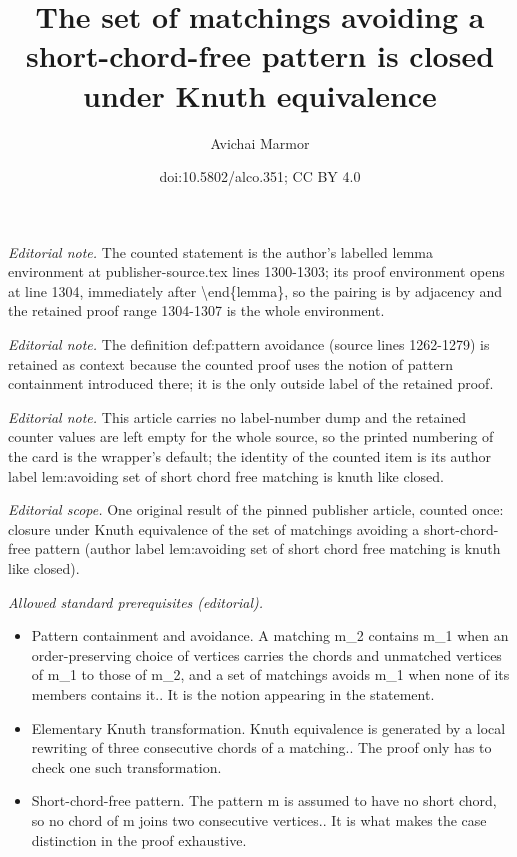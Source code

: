 \documentclass[11pt]{article}
\title{The set of matchings avoiding a short-chord-free pattern is closed under Knuth equivalence}
\author{Avichai Marmor}
\date{doi:10.5802/alco.351; CC BY 4.0}
\theoremstyle{definition}
\numberwithin{equation}{section}
\begin{document}
\maketitle
\noindent\textit{Editorial note.} The counted statement is the author's labelled lemma environment at publisher-source.tex lines 1300-1303; its proof environment opens at line 1304, immediately after \textbackslash{}end\{lemma\}, so the pairing is by adjacency and the retained proof range 1304-1307 is the whole environment.\par\medskip
\noindent\textit{Editorial note.} The definition def:pattern avoidance (source lines 1262-1279) is retained as context because the counted proof uses the notion of pattern containment introduced there; it is the only outside label of the retained proof.\par\medskip
\noindent\textit{Editorial note.} This article carries no label-number dump and the retained counter values are left empty for the whole source, so the printed numbering of the card is the wrapper's default; the identity of the counted item is its author label lem:avoiding set of short chord free matching is knuth like closed.\par\medskip
\noindent\textit{Editorial scope.} One original result of the pinned publisher article, counted once: closure under Knuth equivalence of the set of matchings avoiding a short-chord-free pattern (author label lem:avoiding set of short chord free matching is knuth like closed).\par\medskip
\noindent\textit{Allowed standard prerequisites (editorial).}\begin{itemize}
\item Pattern containment and avoidance. A matching m\_2 contains m\_1 when an order-preserving choice of vertices carries the chords and unmatched vertices of m\_1 to those of m\_2, and a set of matchings avoids m\_1 when none of its members contains it.. It is the notion appearing in the statement.
\item Elementary Knuth transformation. Knuth equivalence is generated by a local rewriting of three consecutive chords of a matching.. The proof only has to check one such transformation.
\item Short-chord-free pattern. The pattern m is assumed to have no short chord, so no chord of m joins two consecutive vertices.. It is what makes the case distinction in the proof exhaustive.
\end{itemize}\medskip
\end{document}

